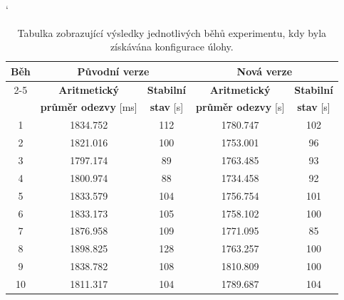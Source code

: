             \begin{table}[ht]
             \catcode`
             \begin{adjustwidth}{-0.5cm}{}
             \begin{center}
              \begin{tabular}{| c || c | c || c | c |} \hline
                \multirow{4}{*}{Běh}  &   \multicolumn{2}{c||}{\textbf{Původní verze}}  &  \multicolumn{2}{c|}{\textbf{Nová verze}}\\ \cline{2-5}
                 & \textbf{Aritmetický} &  \textbf{Stabilní} &  \textbf{Aritmetický}  &  \textbf{Stabilní}\\  
                 & \textbf{průměr odezvy} [ms]  &   \textbf{stav} [s]  &  \textbf{průměr odezvy} [s] &  \textbf{stav} [s]\\\hline
                1 & 1834.752 & 112 &  1780.747 & 102\\\hline
                2  & 1821.016 & 100 & 1753.001 & 96\\\hline
                3 & 1797.174 & 89 & 1763.485 & 93\\\hline
                4 & 1800.974  & 88 & 1734.458 & 92\\\hline
                5 & 1833.579 & 104 & 1756.754 & 101\\\hline\hline
                6 & 1833.173 & 105 & 1758.102 & 100\\\hline
                7 & 1876.958 & 109 & 1771.095 & 85\\\hline
                8 & 1898.825 & 128 & 1763.257 & 100\\\hline
                9 & 1838.782 & 108 & 1810.809 & 100\\\hline
                10 & 1811.317 & 104 & 1789.687 & 104\\\hline
              \end{tabular}
              \caption{Tabulka zobrazující výsledky jednotlivých běhů experimentu, kdy byla získávána konfigurace úlohy.}
              \label{tabgetFreestyleMain}
             \end{center}
            \end{adjustwidth}
            \end{table}

		

